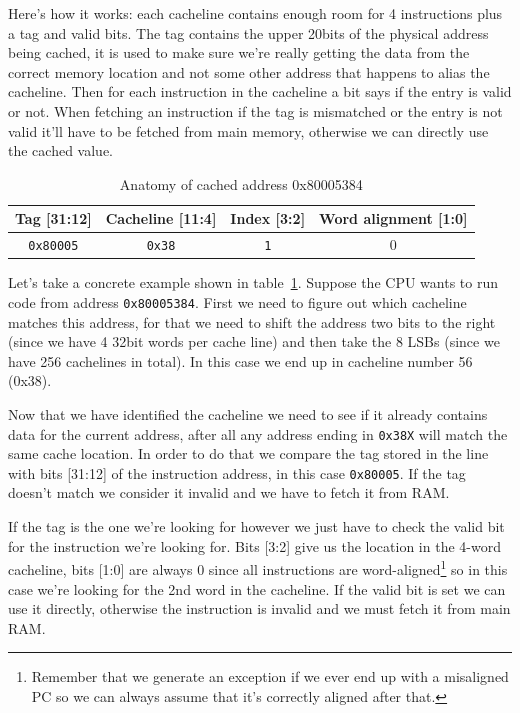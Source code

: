 \documentclass[a4paper]{article}
\newcommand{\code}[1] {\texttt{#1}}
\begin{document}
Here's how it works: each cacheline contains enough room for 4
instructions plus a tag and valid bits. The tag contains the upper
20bits of the physical address being cached, it is used to make sure
we're really getting the data from the correct memory location and not
some other address that happens to alias the cacheline. Then for each
instruction in the cacheline a bit says if the entry is valid or
not. When fetching an instruction if the tag is mismatched or the
entry is not valid it'll have to be fetched from main memory,
otherwise we can directly use the cached value.

\begin{table}[ht]
  \centering
  \begin{tabular}{ c | c | c | c }
    Tag [31:12] & Cacheline [11:4] & Index [3:2] & Word alignment [1:0] \\
    \hline
    \code{0x80005} & \code{0x38} & \code{1} & 0 \\
  \end{tabular}

  \caption{Anatomy of cached address 0x80005384}
  \label{tab:cached-address}
\end{table}

Let's take a concrete example shown in
table~\ref{tab:cached-address}. Suppose the CPU wants to run code from
address \code{0x80005384}. First we need to figure out which cacheline
matches this address, for that we need to shift the address two bits
to the right (since we have 4 32bit words per cache line) and then
take the 8 LSBs (since we have 256 cachelines in total). In this case
we end up in cacheline number 56 (0x38).

Now that we have identified the cacheline we need to see if it already
contains data for the current address, after all any address ending in
\code{0x38X} will match the same cache location. In order to do that
we compare the tag stored in the line with bits [31:12] of the
instruction address, in this case \code{0x80005}. If the tag doesn't
match we consider it invalid and we have to fetch it from RAM.

If the tag is the one we're looking for however we just have to check
the valid bit for the instruction we're looking for. Bits [3:2] give
us the location in the 4-word cacheline, bits [1:0] are always 0 since
all instructions are word-aligned\footnote{Remember that we generate
  an exception if we ever end up with a misaligned PC so we can always
  assume that it's correctly aligned after that.} so in this case
we're looking for the 2nd word in the cacheline. If the valid bit is
set we can use it directly, otherwise the instruction is invalid and
we must fetch it from main RAM.
\end{document}
